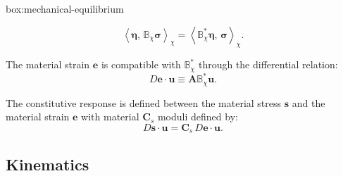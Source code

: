 \begin{ambox}{box:mechanical-equilibrium}
\begin{description}
\begin{equation}
  \left<\bm{\eta},\, \mathbb{B}_\chi\bm{\sigma}\right>_\chi = \left<\mathbb{B}_\chi^*\bm{\eta},\, \bm{\sigma}\right>_\chi.
  \label{eq:def-adjoint}
\end{equation}
\item[Strain]
The material strain \(\bm{e}\) is compatible with
\(\mathbb{B}^*_\chi\) through the differential relation: 
\begin{equation}
  D\bm{e}\cdot\bm{u} \equiv \bm{A}\mathbb{B}^*_\chi \bm{u}.
  \label{eq:vstrain}
\end{equation}
%
\item[Constitution]
The constitutive response is defined between the material stress
\(\bm{s}\) and the material strain \(\bm{e}\) with material \(\bm{C}_s\)  moduli defined by:
\begin{equation}
  D \bm{s}\cdot \bm{u} = \bm{C}_s \, D \bm{e}\cdot {\bm{u}}.
  \label{eq:def-moduli}
\end{equation}
\end{description}
\end{ambox}
\fi
\fi 

\subsection{Kinematics}

